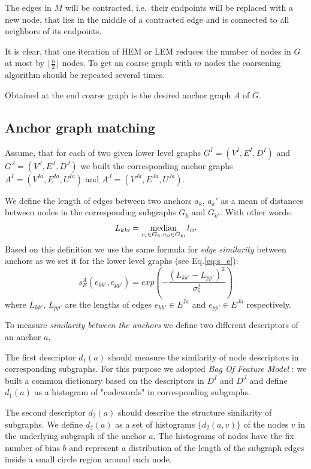 The edges in $M$ will be contracted, i.e.\ their endpoints will be replaced with a new node, that lies in the middle of a contracted edge and is connected to all neighbors of its endpoints.

It is clear, that one iteration of HEM or LEM reduces the number of nodes in $G$ at most by $\lfloor\frac{n}{2} \rfloor$ nodes. To get an coarse graph with $m$ nodes the coarsening algorithm should be repeated several times.

Obtained at the end coarse graph is the desired anchor graph $A$ of $G$. 

\subsection{Anchor graph matching}

Assume, that for each of two given lower level graphs $G^I = (V^I, E^I, D^I)$ and $G^J=(V^J, E^J, D^J)$ we built the corresponding anchor graphs  $A^I=(V^{Ia},E^{Ia}, U^{Ia})$ and $A^J=(V^{Ja},E^{Ja},U^{Ja})$. 

We define the length of edges between two anchors $a_k$, $a_k\prime$ as a mean of distances between nodes in the corresponding subgraphs $G_k$ and $G_{k\prime}$. With other words:
\begin{equation} L_{kk\prime} = \mathop{\rm median}_{v_i\in G_k, v_{i\prime}\in G_{k\prime}} l_{ii\prime} \end{equation}
Based on this definition we use the same formula for \emph{edge similarity} between anchors as we set it for the lower level graphs (see Eq.\ref{eq:s_e}):
\begin{equation} 
s^A_E(e_{kk\prime}, e_{pp\prime}) = exp(-\frac{(L_{kk\prime} - L_{pp\prime})^2}{\sigma^2_{s}})
\label{eq:s_e_A}
\end{equation}
where $L_{kk\prime}$, $L_{pp\prime} $ are the lengths of edges $e_{kk\prime}\in E^{Ia}$ and $e_{pp\prime}\in E^{Ja}$ respectively.

To measure \emph{similarity between the anchors} we  define two different descriptors of an anchor $a$.

The first descriptor $d_1(a)$ should measure the similarity of node descriptors in corresponding subgraphs. For this purpose we adopted \emph{Bag Of Feature Model} : we built a common dictionary based on the descriptors in $D^I$ and $D^J$ and define $d_1(a)$ as a histogram of "codewords" in corresponding subgraphs.

The second descriptor $d_2(a)$ should describe the structure similarity of subgraphs. We define $d_2(a)$ as a set of histograms $\{d_2(a,v)\}$ of the nodes $v$ in the underlying subgraph of the anchor $a$. The histograms of nodes have the fix number of bins $b$ and represent a distribution of the length of the subgraph edges inside a small circle region around each node. 

